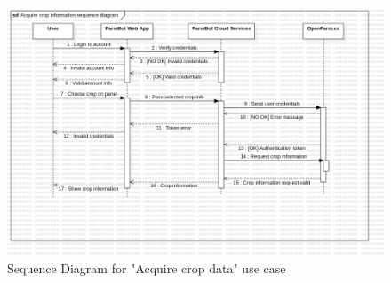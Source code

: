 \begin{figure}[H]
    \centering
    \includegraphics[width=1\textwidth]{UML Diagrams/SequenceDiagram_acquirecropinfo.png}
    \caption{Sequence Diagram for "Acquire crop data" use case}
    \label{fig:configure-farmbot-activity-diagram}
\end{figure}

